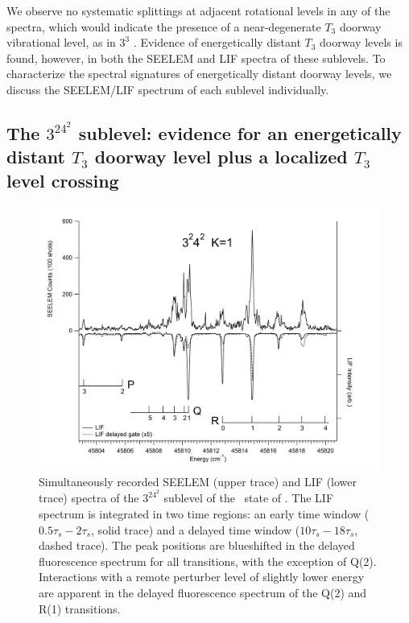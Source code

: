 \documentclass[12pt]{mitthesis}
\begin{document}
We observe no systematic splittings at adjacent rotational levels in
any of the spectra, which would indicate the presence of a
near-degenerate $T_3$ doorway vibrational level, as in $3^3$ 
\cite{mishra04}.  Evidence of energetically distant $T_3$ doorway
levels is found, however, in both the SEELEM and LIF spectra of these
sublevels.  To characterize the spectral signatures of energetically
distant doorway levels, we discuss the SEELEM/LIF spectrum of each
sublevel individually.


\subsection{The $3^24^2$  sublevel: evidence for an
  energetically distant $T_3$ doorway level plus a localized $T_3$
  level crossing}




\begin{figure}
  \caption{Simultaneously recorded SEELEM (upper trace) and LIF (lower
    trace) spectra of the $3^24^2$  sublevel of the \astate\
    state of .  The LIF spectrum is integrated in two time
    regions: an early time window ($0.5\tau_s-2\tau_s$, solid trace)
    and a delayed time window ($10\tau_s-18\tau_s$, dashed trace).
    The peak positions are blueshifted in the delayed fluorescence
    spectrum for all transitions, with the exception of Q(2).
    Interactions with a remote perturber level of slightly lower
    energy are apparent in the delayed fluorescence spectrum of the
    Q(2) and R(1) transitions.}
  \label{fig:spectrum-32b2}
  \centering
  \includegraphics[width=7in,angle=90]{spectrum-3242-p3r4.pdf}
\end{figure}
\end{document}
